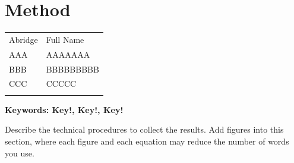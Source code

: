 \section{Method}
\label{sec:method}
\begin{table}[H]
  \centering
  \begin{tabularx}{0.8\linewidth}{Y X}
    \Xhline{1pt}
    Abridge & Full Name \\
    \Xhline{1pt}
    AAA & AAAAAAA \\
    BBB & BBBBBBBBB \\
    CCC & CCCCC \\
    \Xhline{1pt}
  \end{tabularx}
  \label{tab:table}
\end{table}
\textbf{Keywords: Key!, Key!, Key!}

Describe the technical procedures to collect the results.
Add figures into this section, where
each figure and each equation may reduce the number of words you use.